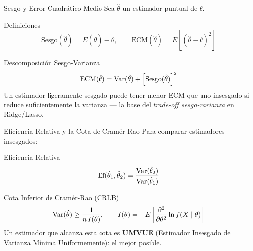 \documentclass[10pt, aspectratio=169]{beamer}
\begin{document}
\begin{frame}{Sesgo y Error Cuadrático Medio}
  \footnotesize
  Sea $\hat\theta$ un estimador puntual de $\theta$. \pause

  \vspace{0.1cm}
  \begin{block}{Definiciones}
    $$\text{Sesgo}(\hat\theta) = E(\hat\theta)-\theta, \qquad \text{ECM}(\hat\theta) = E\left[(\hat\theta-\theta)^2\right]$$
  \end{block}

  \vspace{0.1cm}
  \pause
  \begin{alertblock}{Descomposición Sesgo-Varianza}
    $$\text{ECM}(\hat\theta) = \operatorname{Var}(\hat\theta) + \left[\text{Sesgo}(\hat\theta)\right]^2$$
    Un estimador ligeramente sesgado puede tener menor ECM que uno insesgado si reduce suficientemente la varianza --- la base del \emph{trade-off sesgo-varianza} en Ridge/Lasso.
  \end{alertblock}
\end{frame}

\begin{frame}{Eficiencia Relativa y la Cota de Cramér-Rao}
  \footnotesize
  Para comparar estimadores insesgados: \pause

  \vspace{0.1cm}
  \begin{block}{Eficiencia Relativa}
    $$\text{Ef}(\hat\theta_1,\hat\theta_2) = \dfrac{\operatorname{Var}(\hat\theta_2)}{\operatorname{Var}(\hat\theta_1)}$$
  \end{block}

  \vspace{0.1cm}
  \pause
  \begin{alertblock}{Cota Inferior de Cramér-Rao (CRLB)}
    $$\operatorname{Var}(\hat\theta) \geq \dfrac{1}{n\,I(\theta)}, \qquad I(\theta) = -E\left[\dfrac{\partial^2}{\partial\theta^2}\ln f(X\mid\theta)\right]$$
    Un estimador que alcanza esta cota es \textbf{UMVUE} (Estimador Insesgado de Varianza Mínima Uniformemente): el mejor posible.
  \end{alertblock}
\end{frame}
\end{document}
